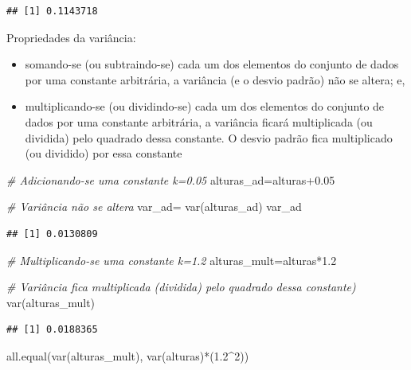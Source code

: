 \documentclass[
]{book}
\newenvironment{Shaded}{\begin{snugshade}}{\end{snugshade}}
\newcommand{\CommentTok}[1]{\textcolor[rgb]{0.56,0.35,0.01}{\textit{#1}}}
\newcommand{\DecValTok}[1]{\textcolor[rgb]{0.00,0.00,0.81}{#1}}
\newcommand{\FloatTok}[1]{\textcolor[rgb]{0.00,0.00,0.81}{#1}}
\newcommand{\FunctionTok}[1]{\textcolor[rgb]{0.00,0.00,0.00}{#1}}
\newcommand{\NormalTok}[1]{#1}
\newcommand{\OtherTok}[1]{\textcolor[rgb]{0.56,0.35,0.01}{#1}}
\newcommand{\SpecialCharTok}[1]{\textcolor[rgb]{0.00,0.00,0.00}{#1}}
\providecommand{\tightlist}{%
  \setlength{\itemsep}{0pt}\setlength{\parskip}{0pt}}
\begin{document}
\begin{verbatim}
## [1] 0.1143718
\end{verbatim}

Propriedades da variância:

\hfill\break

\begin{itemize}
\tightlist
\item
  somando-se (ou subtraindo-se) cada um dos elementos do conjunto de dados por uma constante arbitrária, a variância (e o desvio padrão) não se altera; e,
\item
  multiplicando-se (ou dividindo-se) cada um dos elementos do conjunto de dados por uma constante arbitrária, a variância ficará multiplicada (ou dividida) pelo quadrado dessa constante. O desvio padrão fica multiplicado (ou dividido) por essa constante
\end{itemize}

\hfill\break

\begin{Shaded}
\begin{Highlighting}[]
\CommentTok{\# Adicionando{-}se uma constante k=0.05}
\NormalTok{alturas\_ad}\OtherTok{=}\NormalTok{alturas}\FloatTok{+0.05}

\CommentTok{\# Variância não se altera}
\NormalTok{var\_ad}\OtherTok{=} \FunctionTok{var}\NormalTok{(alturas\_ad)}
\NormalTok{var\_ad}
\end{Highlighting}
\end{Shaded}

\begin{verbatim}
## [1] 0.0130809
\end{verbatim}

\begin{Shaded}
\begin{Highlighting}[]
\CommentTok{\# Multiplicando{-}se uma constante k=1.2}
\NormalTok{alturas\_mult}\OtherTok{=}\NormalTok{alturas}\SpecialCharTok{*}\FloatTok{1.2}

\CommentTok{\# Variância fica multiplicada (dividida) pelo quadrado dessa constante)}
\FunctionTok{var}\NormalTok{(alturas\_mult)}
\end{Highlighting}
\end{Shaded}

\begin{verbatim}
## [1] 0.0188365
\end{verbatim}

\begin{Shaded}
\begin{Highlighting}[]
\FunctionTok{all.equal}\NormalTok{(}\FunctionTok{var}\NormalTok{(alturas\_mult), }\FunctionTok{var}\NormalTok{(alturas)}\SpecialCharTok{*}\NormalTok{(}\FloatTok{1.2}\SpecialCharTok{\^{}}\DecValTok{2}\NormalTok{)) }
\end{Highlighting}
\end{Shaded}
\end{document}
